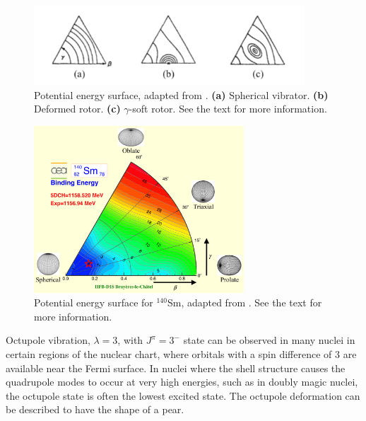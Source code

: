 \documentclass[twoside,english]{uiofysmaster/uiofysmaster}
\newcommand{\Sm}{$^{140}$Sm} %
\newcommand{\ga}{$\gamma$}
\begin{document}
\begin{figure}[htb]
	\centering
	\includegraphics[width=0.9\textwidth]{Images/collective_modes.png}
	\caption{Potential energy surface, adapted from \cite{Heyde}.
	\textbf{(a)} Spherical vibrator.
	\textbf{(b)} Deformed rotor. %
	\textbf{(c)} \ga-soft rotor.
	See the text for more information.
	}
	\label{fig:collective_modes}
\end{figure}

\begin{figure}[htb]
	\centering
	\includegraphics[width=0.7\textwidth]{Images/Triaxial-map-drawing.png}
	\caption{Potential energy surface for \Sm, adapted from \cite{Hilaire2007, CEA}. 
	See the text for more information.}
	\label{fig:cea_tri}
\end{figure}

Octupole vibration, $\lambda = 3$, with $J^\pi = 3^-$ state can be observed in many nuclei in certain regions of the nuclear chart, where orbitals with a spin difference of 3 are available near the Fermi surface.
In nuclei where the shell structure causes the quadrupole modes to occur at very high energies, such as in doubly magic nuclei, the octupole state is often the lowest excited state.
The octupole deformation can be described  to have the shape of a pear.
\end{document}
